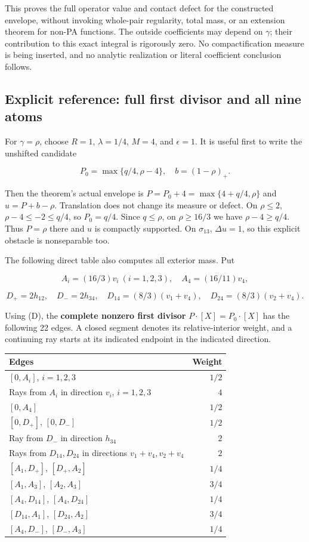 \documentclass[
  10pt,
]{article}
\begin{document}
This proves the full operator value and contact defect for the
constructed envelope, without invoking whole-pair regularity, total
mass, or an extension theorem for non-PA functions. The outside
coefficients may depend on \(\gamma\); their contribution to this exact
integral is rigorously zero. No compactification measure is being
inserted, and no analytic realization or literal coefficient conclusion
follows.

\subsection{Explicit reference: full first divisor and all nine
atoms}\label{explicit-reference-full-first-divisor-and-all-nine-atoms}

For \(\gamma=\rho\), choose \(R=1\), \(\lambda=1/4\), \(M=4\), and
\(\epsilon=1\). It is useful first to write the unshifted candidate

\[
P_0=\max\{q/4,\rho-4\},\quad b=(1-\rho)_+.
\]

Then the theorem's actual envelope is \(P=P_0+4=\max\{4+q/4,\rho\}\) and
\(u=P+b-\rho\). Translation does not change its measure or defect. On
\(\rho\leq2\), \(\rho-4\leq-2\leq q/4\), so \(P_0=q/4\). Since
\(q\leq\rho\), on \(\rho\geq16/3\) we have \(\rho-4\geq q/4\). Thus
\(P=\rho\) there and \(u\) is compactly supported. On \(\sigma_{13}\),
\(\Delta u=1\), so this explicit obstacle is nonseparable too.

The following direct table also computes all exterior mass. Put

\[
A_i=(16/3)v_i\ (i=1,2,3),\quad A_4=(16/11)v_4,
\]

\[
D_+=2h_{12},\quad D_-=2h_{34},\quad
D_{14}=(8/3)(v_1+v_4),\quad D_{24}=(8/3)(v_2+v_4).
\]

Using (D), the \textbf{complete nonzero first divisor}
\(P\cdot[X]=P_0\cdot[X]\) has the following 22 edges. A closed segment
denotes its relative-interior weight, and a continuing ray starts at its
indicated endpoint in the indicated direction.

\begin{longtable}[]{@{}lr@{}}
\toprule\noalign{}
Edges & Weight \\
\midrule\noalign{}
\endhead
\bottomrule\noalign{}
\endlastfoot
\([0,A_i]\), \(i=1,2,3\) & \(1/2\) \\
Rays from \(A_i\) in direction \(v_i\), \(i=1,2,3\) & \(4\) \\
\([0,A_4]\) & \(1/2\) \\
\([0,D_+]\), \([0,D_-]\) & \(1/2\) \\
Ray from \(D_-\) in direction \(h_{34}\) & \(2\) \\
Rays from \(D_{14},D_{24}\) in directions \(v_1+v_4,v_2+v_4\) & \(2\) \\
\([A_1,D_+]\), \([D_+,A_2]\) & \(1/4\) \\
\([A_1,A_3]\), \([A_2,A_3]\) & \(3/4\) \\
\([A_4,D_{14}]\), \([A_4,D_{24}]\) & \(1/4\) \\
\([D_{14},A_1]\), \([D_{24},A_2]\) & \(3/4\) \\
\([A_4,D_-]\), \([D_-,A_3]\) & \(1/4\) \\
\end{longtable}
\end{document}
